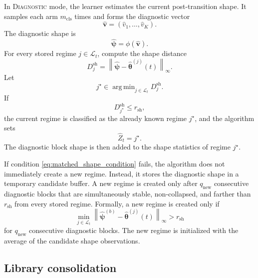 \documentclass[11pt]{article}
\newcommand{\norm}[1]{\left\lVert #1 \right\rVert}
\DeclareMathOperator*{\argmin}{arg\,min}
\begin{document}
In \textsc{Diagnostic} mode, the learner estimates the current post-transition shape. It samples each arm $m_{\mathrm{cls}}$ times and forms the diagnostic vector
\begin{equation}
\label{eq:diagnostic_vector}
\widehat{\bm v}
=
(\widehat v_1,\ldots,\widehat v_K).
\end{equation}
The diagnostic shape is
\begin{equation}
\label{eq:diagnostic_shape}
\widehat{\bm\psi}
=
\phi(\widehat{\bm v}).
\end{equation}
For every stored regime $j\in\mathcal L_t$, compute the shape distance
\begin{equation}
\label{eq:shape_matching_distance}
D_j^{\mathrm{sh}}
=
\norm{\widehat{\bm\psi}-\widehat{\bm\theta}^{(j)}(t)}_{\infty}.
\end{equation}
Let
\begin{equation}
\label{eq:nearest_shape_regime}
j^\star
\in
\argmin_{j\in\mathcal L_t}D_j^{\mathrm{sh}}.
\end{equation}
If
\begin{equation}
\label{eq:matched_shape_condition}
D_{j^\star}^{\mathrm{sh}}\leq r_{\mathrm{sh}},
\end{equation}
the current regime is classified as the already known regime $j^\star$, and the algorithm sets
\begin{equation}
\label{eq:set_matched_shape_regime}
\widehat Z_t=j^\star.
\end{equation}
The diagnostic block shape is then added to the shape statistics of regime $j^\star$.

If condition \eqref{eq:matched_shape_condition} fails, the algorithm does not immediately create a new regime. Instead, it stores the diagnostic shape in a temporary candidate buffer. A new regime is created only after $q_{\mathrm{new}}$ consecutive diagnostic blocks that are simultaneously stable, non-collapsed, and farther than $r_{\mathrm{sh}}$ from every stored regime. Formally, a new regime is created only if
\begin{equation}
\label{eq:persistent_new_regime_condition}
\min_{j\in\mathcal L_t}
\norm{\widehat{\bm\psi}^{(b)}-
\widehat{\bm\theta}^{(j)}(t)}_{\infty}
>
r_{\mathrm{sh}}
\end{equation}
for $q_{\mathrm{new}}$ consecutive diagnostic blocks. The new regime is initialized with the average of the candidate shape observations.

\subsection{Library consolidation}
\label{subsec:library_consolidation}
\end{document}
